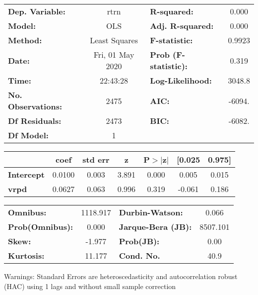\begin{center}
\begin{tabular}{lclc}
\toprule
\textbf{Dep. Variable:}    &       rtrn       & \textbf{  R-squared:         } &     0.000   \\
\textbf{Model:}            &       OLS        & \textbf{  Adj. R-squared:    } &     0.000   \\
\textbf{Method:}           &  Least Squares   & \textbf{  F-statistic:       } &    0.9923   \\
\textbf{Date:}             & Fri, 01 May 2020 & \textbf{  Prob (F-statistic):} &    0.319    \\
\textbf{Time:}             &     22:43:28     & \textbf{  Log-Likelihood:    } &    3048.8   \\
\textbf{No. Observations:} &        2475      & \textbf{  AIC:               } &    -6094.   \\
\textbf{Df Residuals:}     &        2473      & \textbf{  BIC:               } &    -6082.   \\
\textbf{Df Model:}         &           1      & \textbf{                     } &             \\
\bottomrule
\end{tabular}
\begin{tabular}{lcccccc}
                   & \textbf{coef} & \textbf{std err} & \textbf{z} & \textbf{P$> |$z$|$} & \textbf{[0.025} & \textbf{0.975]}  \\
\midrule
\textbf{Intercept} &       0.0100  &        0.003     &     3.891  &         0.000        &        0.005    &        0.015     \\
\textbf{vrpd}      &       0.0627  &        0.063     &     0.996  &         0.319        &       -0.061    &        0.186     \\
\bottomrule
\end{tabular}
\begin{tabular}{lclc}
\textbf{Omnibus:}       & 1118.917 & \textbf{  Durbin-Watson:     } &    0.066  \\
\textbf{Prob(Omnibus):} &   0.000  & \textbf{  Jarque-Bera (JB):  } & 8507.101  \\
\textbf{Skew:}          &  -1.977  & \textbf{  Prob(JB):          } &     0.00  \\
\textbf{Kurtosis:}      &  11.177  & \textbf{  Cond. No.          } &     40.9  \\
\bottomrule
\end{tabular}
\end{center}

Warnings: \newline
 [1] Standard Errors are heteroscedasticity and autocorrelation robust (HAC) using 1 lags and without small sample correction